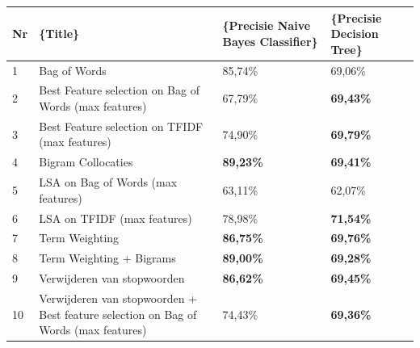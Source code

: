 \begin{table}[h]
\centering
\begin{adjustbox}{width=1\textwidth}
\begin{tabular}{|l|l|l|l|}
\hline
{\bf Nr} & \{\bf Title\}                                                                       & \{\bf Precisie Naive Bayes Classifier\} & \{\bf Precisie Decision Tree\} \\ \hline
1        & Bag of Words                                                                        & 85,74\%                                 & 69,06\%                        \\ \hline
2        & Best Feature selection on Bag of Words (max features)                               & 67,79\%                                 & {\bf 69,43\%}                  \\ \hline
3        & Best Feature selection on TFIDF (max features)                                      & 74,90\%                                 & {\bf 69,79\%}                  \\ \hline
4        & Bigram Collocaties                                                                  & {\bf 89,23\%}                           & {\bf 69,41\%}                  \\ \hline
5        & LSA on Bag of Words (max features)                                                  & 63,11\%                                 & 62,07\%                        \\ \hline
6        & LSA on TFIDF (max features)                                                         & 78,98\%                                 & {\bf 71,54\%}                  \\ \hline
7        & Term Weighting                                                                      & {\bf 86,75\%}                           & {\bf 69,76\%}                  \\ \hline
8        & Term Weighting + Bigrams                                                            & {\bf 89,00\%}                           & {\bf 69,28\%}                  \\ \hline
9        & Verwijderen van stopwoorden                                                         & {\bf 86,62\%}                           & {\bf 69,45\%}                  \\ \hline
10        & Verwijderen van stopwoorden + Best feature selection on Bag of Words (max features) & 74,43\%                                 & {\bf 69,36\%}                  \\ \hline

\end{tabular}
\end{adjustbox}
\end{table}
